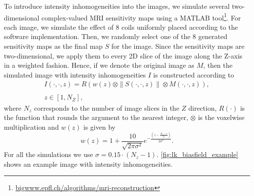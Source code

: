 To introduce intensity inhomogeneities into the images, we simulate several two-
dimensional complex-valued MRI sensitivity maps using a MATLAB
tool\footnote{\url{bigwww.epfl.ch/algorithms/mri-reconstruction}}. For each
image, we simulate the effect of 8 coils uniformly placed according to the
software implementation. Then, we randomly select one of the 8 generated
sensitivity maps as the final map $S$ for the image. Since the sensitivity maps
are two-dimensional, we apply them to every 2D slice of the image along the
Z-axis in a weighted fashion. Hence, if we denote the original image as $M$,
then the simulated image with intensity inhomogeneities $I$ is constructed
according to
\begin{equation*}
    \begin{array}{c}
        I(\cdot,\cdot,z) = R\left(w(z) \otimes \|S(\cdot,\cdot,z)\| \otimes M(\cdot,\cdot,z)\right), \\ \\ z \in [1, N_{Z}],
    \end{array}
\end{equation*}
where $N_{z}$ corresponds to the number of image slices in the $Z$ direction,
$R(\cdot)$ is the function that rounds the argument to the nearest integer,
$\otimes$ is the voxelwise multiplication and $w(z)$ is given by
\begin{equation*}
    w(z) = 1 + \frac{10}{\sqrt{2\pi\sigma^{2}}}e^{-\frac{\left(z - \frac{N_{z}-1}{2}\right)}{2\sigma^{2}}}.
\end{equation*}
For all the simulations we use $\sigma = 0.15 \cdot (N_{z} - 1)$.
\cref{fig:lk_biasfield_example} shows an example image with intensity
inhomogeneities.

